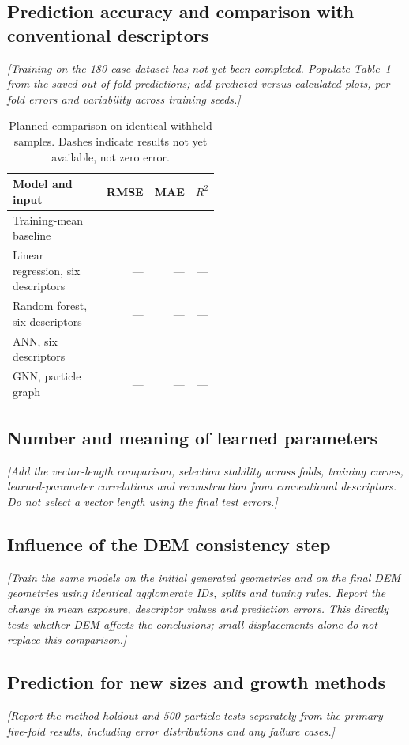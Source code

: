 \documentclass[11pt,a4paper]{article}
\newcommand{\pending}[1]{{\color{red}\textit{[#1]}}}
\begin{document}
\subsection{Prediction accuracy and comparison with conventional descriptors}
\pending{Training on the 180-case dataset has not yet been completed. Populate Table~\ref{tab:ml} from the saved out-of-fold predictions; add predicted-versus-calculated plots, per-fold errors and variability across training seeds.}
\begin{table}[htbp]
\centering\small
\caption{Planned comparison on identical withheld samples. Dashes indicate results not yet available, not zero error.}\label{tab:ml}
\begin{tabular}{@{}p{0.52\linewidth}rrr@{}}\toprule
Model and input & RMSE & MAE & $R^2$\\\midrule
Training-mean baseline & --- & --- & ---\\
Linear regression, six descriptors & --- & --- & ---\\
Random forest, six descriptors & --- & --- & ---\\
ANN, six descriptors & --- & --- & ---\\
GNN, particle graph & --- & --- & ---\\\bottomrule
\end{tabular}
\end{table}

\subsection{Number and meaning of learned parameters}
\pending{Add the vector-length comparison, selection stability across folds, training curves, learned-parameter correlations and reconstruction from conventional descriptors. Do not select a vector length using the final test errors.}

\subsection{Influence of the DEM consistency step}
\pending{Train the same models on the initial generated geometries and on the final DEM geometries using identical agglomerate IDs, splits and tuning rules. Report the change in mean exposure, descriptor values and prediction errors. This directly tests whether DEM affects the conclusions; small displacements alone do not replace this comparison.}

\subsection{Prediction for new sizes and growth methods}
\pending{Report the method-holdout and 500-particle tests separately from the primary five-fold results, including error distributions and any failure cases.}
\end{document}
